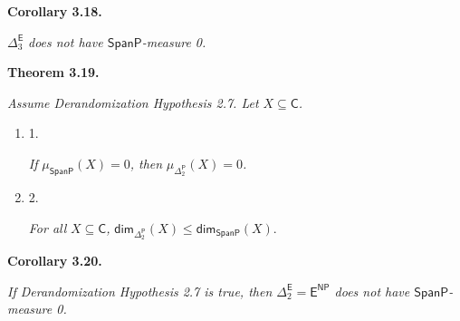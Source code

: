 



\par\medskip\noindent\textbf{
\textbf{Corollary 3.18}\textbf{.}
}\par



$\Delta^{\mathsf{E}}_{3}$\emph{ does not have $\mathsf{SpanP}$-measure 0.}\par







\par\medskip\noindent\textbf{
\textbf{Theorem 3.19}\textbf{.}
}\par



\emph{Assume Derandomization Hypothesis 2.7.
Let $X\subseteq\mathsf{C}$.}\par


\begin{enumerate}


\item[] 
1. 


\emph{If }$\mu_{\mathsf{SpanP}}(X)=0$\emph{, then }$\mu_{\Delta^{\mathsf{P}}_{2}}(X)=0$\emph{.}\par





\item[] 
2. 


\emph{For all }$X\subseteq\mathsf{C}$\emph{,
}${\mathsf{dim}}_{\Delta^{\mathsf{P}}_{2}}(X)\leq{\mathsf{dim}}_{\mathsf{SpanP}}(X).$\emph{}\par





\end{enumerate}







\par\medskip\noindent\textbf{
\textbf{Corollary 3.20}\textbf{.}
}\par



\emph{If Derandomization Hypothesis 2.7 is true, then
$\Delta^{\mathsf{E}}_{2}=\mathsf{E}^{\mathsf{NP}}$ does not have $\mathsf{SpanP}$-measure 0.}\par



